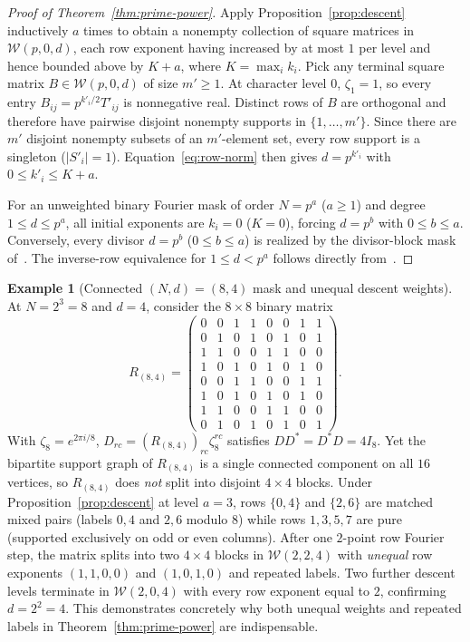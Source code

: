\documentclass[11pt,reqno]{amsart}
\numberwithin{equation}{section}
\theoremstyle{definition}
\newtheorem{example}[theorem]{Example}
\theoremstyle{remark}
\begin{document}
\begin{proof}[Proof of Theorem~\ref{thm:prime-power}]
Apply Proposition~\ref{prop:descent} inductively $a$ times to obtain a nonempty collection of square matrices in $\mathcal{W}(p,0,d)$, each row exponent having increased by at most $1$ per level and hence bounded above by $K+a$, where $K=\max_i k_i$. Pick any terminal square matrix $B\in\mathcal{W}(p,0,d)$ of size $m'\ge 1$. At character level $0$, $\zeta_1=1$, so every entry $B_{ij}=p^{k'_i/2}T'_{ij}$ is nonnegative real. Distinct rows of $B$ are orthogonal and therefore have pairwise disjoint nonempty supports in $\{1,\ldots,m'\}$. Since there are $m'$ disjoint nonempty subsets of an $m'$-element set, every row support is a singleton ($|S'_i|=1$). Equation~\eqref{eq:row-norm} then gives $d=p^{k'_i}$ with $0\le k'_i\le K+a$.

For an unweighted binary Fourier mask of order $N=p^a$ ($a\ge 1$) and degree $1\le d\le p^a$, all initial exponents are $k_i=0$ ($K=0$), forcing $d=p^b$ with $0\le b\le a$. Conversely, every divisor $d=p^b$ ($0\le b\le a$) is realized by the divisor-block mask of~\cite[Section~2.1]{KKKKK26}. The inverse-row equivalence for $1\le d<p^a$ follows directly from~\cite[Theorem~1.1]{KKKKK26}.
\end{proof}

\begin{example}[Connected $(N,d)=(8,4)$ mask and unequal descent weights]
\label{ex:connected84}
At $N=2^3=8$ and $d=4$, consider the $8\times 8$ binary matrix
\[
R_{(8,4)} = \begin{pmatrix}
0&0&1&1&0&0&1&1\\
0&1&0&1&0&1&0&1\\
1&1&0&0&1&1&0&0\\
1&0&1&0&1&0&1&0\\
0&0&1&1&0&0&1&1\\
1&0&1&0&1&0&1&0\\
1&1&0&0&1&1&0&0\\
0&1&0&1&0&1&0&1
\end{pmatrix}.
\]
With $\zeta_8=e^{2\pi i/8}$, $D_{rc}=(R_{(8,4)})_{rc}\zeta_8^{rc}$ satisfies $DD^*=D^*D=4I_8$. Yet the bipartite support graph of $R_{(8,4)}$ is a single connected component on all $16$ vertices, so $R_{(8,4)}$ does \emph{not} split into disjoint $4\times 4$ blocks. Under Proposition~\ref{prop:descent} at level $a=3$, rows $\{0,4\}$ and $\{2,6\}$ are matched mixed pairs (labels $0,4$ and $2,6$ modulo $8$) while rows $1,3,5,7$ are pure (supported exclusively on odd or even columns). After one $2$-point row Fourier step, the matrix splits into two $4\times 4$ blocks in $\mathcal{W}(2,2,4)$ with \emph{unequal} row exponents $(1,1,0,0)$ and $(1,0,1,0)$ and repeated labels. Two further descent levels terminate in $\mathcal{W}(2,0,4)$ with every row exponent equal to $2$, confirming $d=2^2=4$. This demonstrates concretely why both unequal weights and repeated labels in Theorem~\ref{thm:prime-power} are indispensable.
\end{example}
\end{document}
